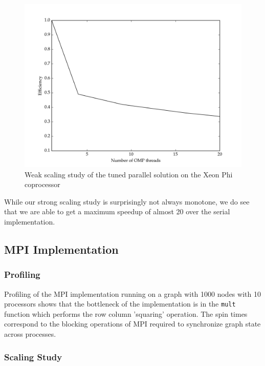 \documentclass[11pt]{article}
\begin{document}
\begin{figure}[H]
\centering
\includegraphics[scale=0.5]{./scaling_studies/weak_scaling_offload.png}
\caption{Weak scaling study of the tuned parallel solution on the Xeon Phi coprocessor}
\label{fig:ws_offload}
\end{figure}

While our strong scaling study is surprisingly not always monotone, we do see that we are able to get a maximum speedup of almost 20 over the serial implementation.

\subsection{MPI Implementation}

\subsubsection{Profiling}

Profiling of the MPI implementation running on a graph with 1000 nodes with 10 processors shows that the bottleneck of the implementation is in the \texttt{mult} function which performs the row column 'squaring' operation. The spin times correspond to the blocking operations of MPI required to synchronize graph state across processes. 




\subsubsection{Scaling Study}
\end{document}
